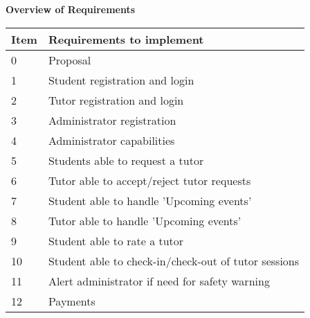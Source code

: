 \documentclass[12pt]{article}
\begin{document}
\begin{flushleft}
\textbf{Overview of Requirements}
\end{flushleft}
{
\centering
\begin{longtable}{| p{1.5cm} | p{13cm}|  }
\hline			
\textbf{Item} & \textbf{Requirements to implement}	
			
	\\ \hline 0 & Proposal 
		\\ \hline 1 & Student registration and login \\ \hline 
			
			2 & Tutor registration and login \\ \hline	
 
			3 & Administrator registration  \\ \hline  

			
			4 & Administrator capabilities\\ \hline 
			
			5 & Students able to request a tutor\\ \hline

				6 & Tutor able to accept/reject tutor requests\\ \hline

				7 & Student able to handle 'Upcoming events'   \\ \hline	
				
				8 & Tutor able to handle 'Upcoming events'  \\ \hline	
							
				9 & Student able to rate a tutor \\ \hline

				10 & Student able to check-in/check-out of tutor sessions  \\ \hline	

				11 & Alert administrator if need for safety warning   \\ \hline	

				12 & Payments \\ \hline	



	
\end{longtable}
}
\end{document}
